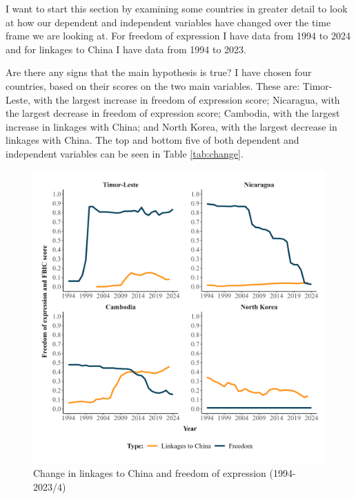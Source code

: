 I want to start this section by examining some countries in greater detail to look at how our dependent and independent variables have changed over the time frame we are looking at. For freedom of expression I have data from 1994 to 2024 and for linkages to China I have data from 1994 to 2023. 

Are there any signs that the main hypothesis is true? I have chosen four countries, based on their scores on the two main variables. These are: Timor-Leste, with the largest increase in freedom of expression score; Nicaragua, with the largest decrease in freedom of expression score; Cambodia, with the largest increase in linkages with China; and North Korea, with the largest decrease in linkages with China. The top and bottom five of both dependent and independent variables can be seen in Table \ref{tab:change}.

\begin{figure}[!hbt]
    \centering
    \includegraphics[width=\linewidth]{graphics/single_country_plots.jpeg}
    \caption{Change in linkages to China and freedom of expression (1994-2023/4)}
    \label{fig:scp}
\end{figure}


